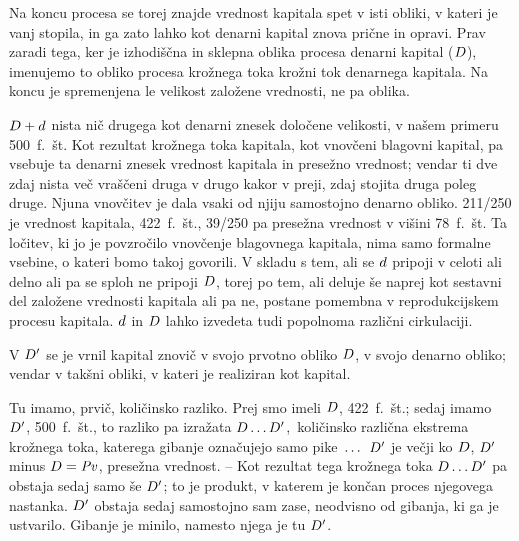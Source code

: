 \documentclass[kapital_02.tex]{subfiles}
\begin{document}
Na koncu procesa se torej znajde vrednost kapitala spet v isti obliki, v kateri je vanj stopila, in ga zato lahko kot denarni kapital znova prične in opravi. Prav zaradi tega, ker je izhodiščna in sklepna oblika procesa denarni kapital (\(D\)), imenujemo to obliko procesa krožnega toka krožni tok denarnega kapitala. Na koncu je spremenjena le velikost založene vrednosti, ne pa oblika.

\(D + d\) nista nič drugega kot denarni znesek določene velikosti, v našem primeru 500\ f.\ št. Kot rezultat krožnega toka kapitala, kot vnovčeni blagovni kapital, pa vsebuje ta denarni znesek vrednost kapitala in presežno vrednost; vendar ti dve zdaj nista več vraščeni druga v drugo kakor v preji, zdaj stojita druga poleg druge. Njuna vnovčitev je dala vsaki od njiju samostojno denarno obliko. 211/250 je vrednost kapitala, 422\ f.\ št., 39/250 pa presežna vrednost v višini 78\ f.\ št. Ta ločitev, ki jo je povzročilo vnovčenje blagovnega kapitala, nima samo formalne vsebine, o kateri bomo takoj govorili. V skladu s tem, ali se \(d\) pripoji v celoti ali delno ali pa se sploh ne pripoji \(D\), torej po tem, ali deluje še naprej kot sestavni del založene vrednosti kapitala ali pa ne, postane pomembna v reprodukcijskem procesu kapitala. \(d\) in \(D\) lahko izvedeta tudi popolnoma različni cirkulaciji.

V \(D'\) se je vrnil kapital znovič v svojo prvotno obliko \(D\), v svojo denarno obliko; vendar v takšni obliki, v kateri je realiziran kot kapital.

Tu imamo, prvič, količinsko razliko. Prej smo imeli \(D\), 422\ f.\ št.; sedaj imamo \(D'\), 500\ f.\ št., to razliko pa izražata \(D\dots D'\),\KPEstran\ količinsko različna ekstrema krožnega toka, katerega gibanje označujejo samo pike~\(\dots\) \(D'\) je večji ko \(D\), \(D'\) minus \(D = \mathit{Pv}\), presežna vrednost. -- Kot rezultat tega krožnega toka \(D\dots D'\) pa obstaja sedaj samo še \(D'\); to je produkt, v katerem je končan proces njegovega nastanka. \(D'\) obstaja sedaj samostojno sam zase, neodvisno od gibanja, ki ga je ustvarilo. Gibanje je minilo, namesto njega je tu \(D'\).
\end{document}
